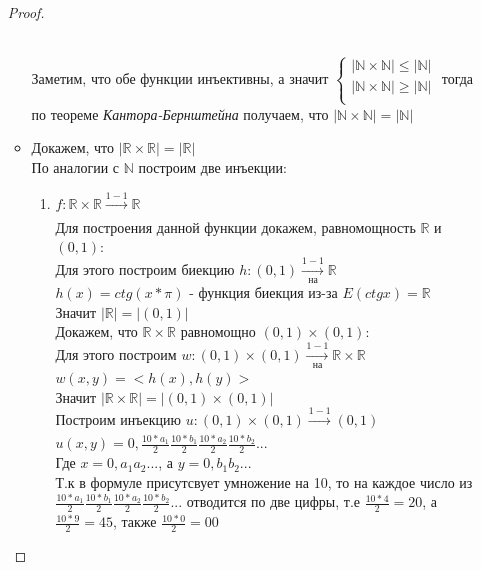 \documentclass[a4paper]{article}
\theoremstyle{definition}
\begin{document}
\begin{enumerate}
\begin{proof}
\begin{itemize}
               \\ Заметим, что обе функции инъективны, а значит $\left\{
                \begin{matrix}
                 |\mathbb {N} \times{\mathbb{N}|} \leq |\mathbb {N}| \\
                 |\mathbb {N} \times{\mathbb{N}|} \geq |\mathbb {N}| \\
                \end{matrix}
                \right.$
               тогда по теореме \textit{Кантора-Бернштейна} получаем, что $|\mathbb {N} \times{\mathbb{N}|} = |\mathbb {N}|$
         \item Докажем, что $|\mathbb{R} \times{\mathbb{R}|} = |\mathbb{R}|$\\
               По аналогии с $\mathbb{N}$ построим две инъекции: \\
               \begin{enumerate}
                \item $f: \mathbb{R}\times{\mathbb{R}} \xrightarrow[]{1-1}{\mathbb{R}}$
                      \\Для построения данной функции докажем, равномощность $\mathbb{R}$ и $(0,1)$:\\
                      Для этого построим биекцию $h: (0,1) \xrightarrow[\text{на}]{1-1} \mathbb{R}$
                      \\ $h(x) = ctg(x*\pi)$ - функция биекция из-за $E(ctg x) = \mathbb{R}$\\
                      Значит $|\mathbb{R}| = |(0,1)|$
                      \\Докажем, что $\mathbb{R}\times{\mathbb{R}}$ равномощно $(0,1)\times(0,1)$:
                      \\ Для этого построим $w: (0,1)\times(0,1)\xrightarrow[\text{на}]{1-1} \mathbb{R}\times{\mathbb{R}}$
                      \\ $w(x,y)=<h(x), h(y)>$\\
                      Значит $|\mathbb{R}\times{\mathbb{R}}| = |(0,1)\times(0,1)|$
                      \\ Построим инъекцию $u: (0,1)\times(0,1)\xrightarrow[]{1-1}(0,1)$
                      \\$u(x,y)=0,\frac{10*a_1}{2}\frac{10*b_1}{2}\frac{10*a_2}{2}\frac{10*b_2}{2}...$\\
                       Где $x = 0,a_{1}a_{2}...$, а $y=0,b_{1}b_{2}...$
                       \\ Т.к в формуле присутсвует умножение на 10, то на каждое число из $\frac{10*a_1}{2}\frac{10*b_1}{2}\frac{10*a_2}{2}\frac{10*b_2}{2}...$ отводится по две цифры, т.е $\frac{10*4}{2} = 20$, а $\frac{10*9}{2}=45$, также $\frac{10*0}{2}=00$

\end{enumerate}
\end{itemize}
\end{proof}
\end{enumerate}
\end{document}
